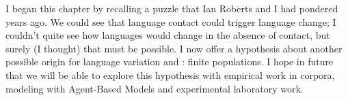 \documentclass[output=paper]{langsci/langscibook}
\begin{document}
I began this chapter by recalling a puzzle that Ian Roberts and I had
pondered years ago.  We could see that language contact could trigger
language change; I couldn't quite see how languages would change in
the absence of contact, but surely (I thought) that must be possible.
I now offer a hypothesis about another possible origin for language
variation and : finite populations. I hope in future
that we will be able to explore this hypothesis with empirical work in
corpora, modeling with Agent-Based Models and experimental laboratory
work.

{\sloppy
\printbibliography[heading=subbibliography,notkeyword=this]
}
\end{document}
